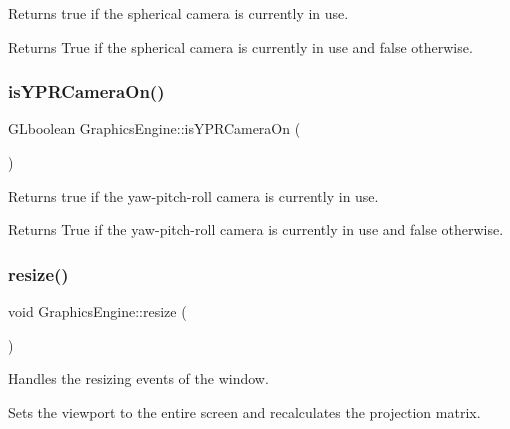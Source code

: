 Returns true if the spherical camera is currently in use. 

\begin{DoxyReturn}{Returns}
True if the spherical camera is currently in use and false otherwise. 
\end{DoxyReturn}
\mbox{\label{class_graphics_engine_a8ed6b779b8696620241ba701afd6de67}} 
\subsubsection{\texorpdfstring{is\+Y\+P\+R\+Camera\+On()}{isYPRCameraOn()}}
{\footnotesize\ttfamily G\+Lboolean Graphics\+Engine\+::is\+Y\+P\+R\+Camera\+On (\begin{DoxyParamCaption}{ }\end{DoxyParamCaption})}



Returns true if the yaw-\/pitch-\/roll camera is currently in use. 

\begin{DoxyReturn}{Returns}
True if the yaw-\/pitch-\/roll camera is currently in use and false otherwise. 
\end{DoxyReturn}
\mbox{\label{class_graphics_engine_a6a38e40ee4227a8b53dddf07f92323ee}} 
\subsubsection{\texorpdfstring{resize()}{resize()}}
{\footnotesize\ttfamily void Graphics\+Engine\+::resize (\begin{DoxyParamCaption}{ }\end{DoxyParamCaption})}



Handles the resizing events of the window. 

Sets the viewport to the entire screen and recalculates the projection matrix. \mbox{\label{class_graphics_engine_abc1591d1873ad66188c5b7613606e8ab}} 
